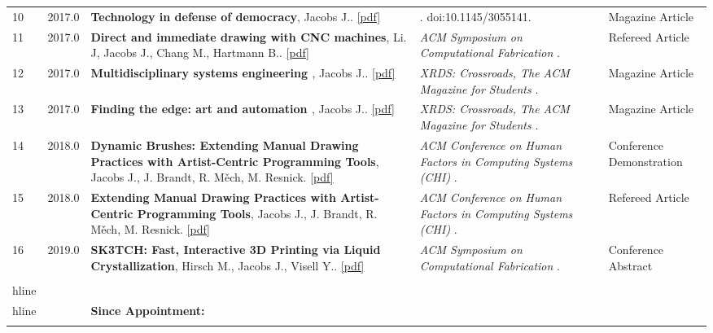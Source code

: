 \begin{longtable}{lcp{7.75cm}>{\raggedright}p{5.25cm}p{1.75cm}}
    10 & 2017.0 & {\bf Technology in defense of democracy}, Jacobs J.. \href{nan}{[pdf]} & \emph{  } . doi:10.1145/3055141.  & Magazine Article\\
    11 & 2017.0 & {\bf Direct and immediate drawing with CNC machines}, Li. J, Jacobs J., Chang M., Hartmann B.. \href{nan}{[pdf]} & \emph{ ACM Symposium on Computational Fabrication } .   & Refereed Article\\
    12 & 2017.0 & {\bf Multidisciplinary systems engineering }, Jacobs J.. \href{nan}{[pdf]} & \emph{ XRDS: Crossroads, The ACM Magazine for Students } .   & Magazine Article\\
    13 & 2017.0 & {\bf Finding the edge: art and automation }, Jacobs J.. \href{nan}{[pdf]} & \emph{ XRDS: Crossroads, The ACM Magazine for Students } .   & Magazine Article\\
    14 & 2018.0 & {\bf Dynamic Brushes: Extending Manual Drawing Practices with Artist-Centric Programming Tools}, Jacobs J., J. Brandt, R. Měch, M. Resnick. \href{nan}{[pdf]} & \emph{ ACM Conference on Human Factors in Computing Systems (CHI) } .   & Conference Demonstration\\
    15 & 2018.0 & {\bf Extending Manual Drawing Practices with Artist-Centric Programming Tools}, Jacobs J., J. Brandt, R. Měch, M. Resnick. \href{nan}{[pdf]} & \emph{ ACM Conference on Human Factors in Computing Systems (CHI) } .   & Refereed Article\\
    16 & 2019.0 & {\bf SK3TCH: Fast, Interactive 3D Printing via Liquid Crystallization}, Hirsch M., Jacobs J., Visell Y.. \href{nan}{[pdf]} & \emph{ ACM Symposium on Computational Fabrication } .   & Conference Abstract\\
\\hline
\\hline
   &   & {\bf Since Appointment:} &    &   \\\\
\end{longtable}
